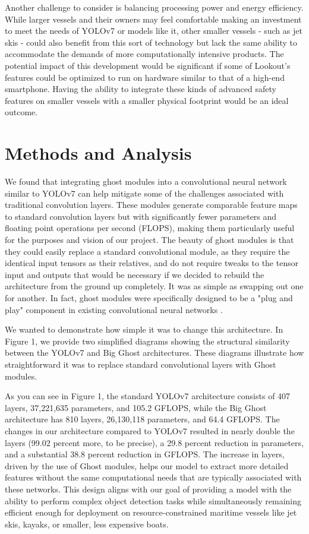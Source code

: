 \documentclass[sigplan,nonacm]{acmart}
\begin{document}
Another challenge to consider is balancing processing power and energy efficiency. While larger vessels and their owners may feel comfortable making an investment to meet the needs of YOLOv7 or models like it, other smaller vessels - such as jet skis - could also benefit from this sort of technology but lack the same ability to accommodate the demands of more computationally intensive products. The potential impact of this development would be significant if some of Lookout's features could be optimized to run on hardware similar to that of a high-end smartphone. Having the ability to integrate these kinds of advanced safety features on smaller vessels with a smaller physical footprint would be an ideal outcome. 

\section*{Methods and Analysis}
We found that integrating ghost modules into a convolutional neural network similar to YOLOv7 can help mitigate some of the challenges associated with traditional convolution layers. These modules generate comparable feature maps to standard convolution layers but with significantly fewer parameters and floating point operations per second (FLOPS), making them particularly useful for the purposes and vision of our project. The beauty of ghost modules is that they could easily replace a standard convolutional module, as they require the identical input tensors as their relatives, and do not require tweaks to the tensor input and outputs that would be necessary if we decided to rebuild the architecture from the ground up completely. It was as simple as swapping out one for another. In fact, ghost modules were specifically designed to be a "plug and play" component in existing convolutional neural networks \cite{han2020ghostnet} .

We wanted to demonstrate how simple it was to change this architecture. In Figure 1, we provide two simplified diagrams showing the structural similarity between the YOLOv7 and Big Ghost architectures. These diagrams illustrate how straightforward it was to replace standard convolutional layers with Ghost modules. 

As you can see in Figure 1, the standard YOLOv7 architecture consists of 407 layers, 37,221,635 parameters, and 105.2 GFLOPS, while the Big Ghost architecture has 810 layers, 26,130,118 parameters, and 64.4 GFLOPS. The changes in our architecture compared to YOLOv7 resulted in nearly double the layers (99.02 percent more, to be precise), a 29.8 percent reduction in parameters, and a substantial 38.8 percent reduction in GFLOPS. The increase in layers, driven by the use of Ghost modules, helps our model to extract more detailed features without the same computational needs that are typically associated with these networks. This design aligns with our goal of providing a model with the ability to perform complex object detection tasks while simultaneously remaining efficient enough for deployment on resource-constrained maritime vessels like jet skis, kayaks, or smaller, less expensive boats. 
\end{document}
